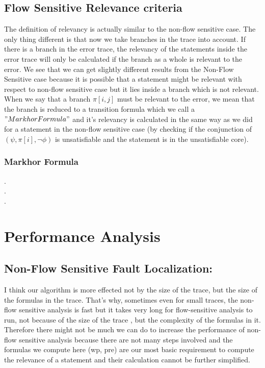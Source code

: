 \documentclass{article}
\begin{document}
\subsection{Flow Sensitive Relevance criteria }
The definition of relevancy is actually similar to the non-flow sensitive case. The only thing different is that now we take branches in the trace into account. If there is a branch in the error trace, the relevancy of the statements inside the error trace will only be calculated if the branch as a whole is relevant to the error. We see that we can get slightly different results from the Non-Flow Sensitive case because it is possible that a statement might be relevant with respect to non-flow sensitive case but it lies inside a branch which is not relevant. \\
When we say that a branch $\pi[i,j]$ must be relevant to the error, we mean that the branch is reduced to a transition formula which we call a $"Markhor Formula"$ and it's relevancy is calculated in the same way as we did for a statement in the non-flow sensitive case (by checking if the conjunction of $(\psi, \pi[i],\neg \phi)$ is unsatisfiable and the statement is in the unsatisfiable core).
\subsubsection{Markhor Formula}
.\\
.\\
.

\section{Performance Analysis}
\subsection{Non-Flow Sensitive Fault Localization:}
I think our algorithm is more effected not by the size of the trace, but the size of the formulas in the trace. That's why, sometimes even for small traces, the non-flow sensitive analysis is fast but it takes very long for flow-sensitive analysis to run, not because  of the size of the trace , but the complexity of the formulas in it. \\
Therefore there might not be much we can do to increase the performance of non-flow sensitive analysis because there are not many steps involved and the formulas we compute here (wp, pre) are our most basic requirement to compute the relevance of a statement and their calculation cannot be further simplified.
\end{document}

